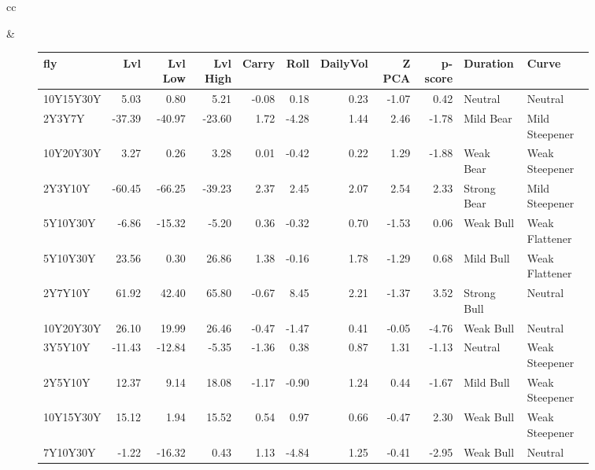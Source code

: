 \documentclass[a4paper,oneside]{report}
\begin{document}
\begin{figure}[htbp]
\begin{tabular}[c]{cc}
 
\begin{subfigure}[c]{0.5\textwidth}
 
 \end{subfigure}&
 
 \begin{subfigure}[c]{0.5\textwidth}
 \begin{adjustbox}{max width=\textwidth}
 \begin{tabular}{lrrrrrrrrll}
\hline
       fly &    Lvl &  Lvl Low &  Lvl High &  Carry &  Roll &  DailyVol &  Z PCA &  p-score &     Duration &           Curve \\
\hline
 10Y15Y30Y &   5.03 &     0.80 &      5.21 &  -0.08 &  0.18 &      0.23 &  -1.07 &     0.42 &      Neutral &         Neutral \\
    2Y3Y7Y & -37.39 &   -40.97 &    -23.60 &   1.72 & -4.28 &      1.44 &   2.46 &    -1.78 &    Mild Bear &  Mild Steepener \\
 10Y20Y30Y &   3.27 &     0.26 &      3.28 &   0.01 & -0.42 &      0.22 &   1.29 &    -1.88 &    Weak Bear &  Weak Steepener \\
   2Y3Y10Y & -60.45 &   -66.25 &    -39.23 &   2.37 &  2.45 &      2.07 &   2.54 &     2.33 &  Strong Bear &  Mild Steepener \\
  5Y10Y30Y &  -6.86 &   -15.32 &     -5.20 &   0.36 & -0.32 &      0.70 &  -1.53 &     0.06 &    Weak Bull &  Weak Flattener \\
  5Y10Y30Y &  23.56 &     0.30 &     26.86 &   1.38 & -0.16 &      1.78 &  -1.29 &     0.68 &    Mild Bull &  Weak Flattener \\
   2Y7Y10Y &  61.92 &    42.40 &     65.80 &  -0.67 &  8.45 &      2.21 &  -1.37 &     3.52 &  Strong Bull &         Neutral \\
 10Y20Y30Y &  26.10 &    19.99 &     26.46 &  -0.47 & -1.47 &      0.41 &  -0.05 &    -4.76 &    Weak Bull &         Neutral \\
   3Y5Y10Y & -11.43 &   -12.84 &     -5.35 &  -1.36 &  0.38 &      0.87 &   1.31 &    -1.13 &      Neutral &  Weak Steepener \\
   2Y5Y10Y &  12.37 &     9.14 &     18.08 &  -1.17 & -0.90 &      1.24 &   0.44 &    -1.67 &    Mild Bull &  Weak Steepener \\
 10Y15Y30Y &  15.12 &     1.94 &     15.52 &   0.54 &  0.97 &      0.66 &  -0.47 &     2.30 &    Weak Bull &  Weak Steepener \\
  7Y10Y30Y &  -1.22 &   -16.32 &      0.43 &   1.13 & -4.84 &      1.25 &  -0.41 &    -2.95 &    Weak Bull &         Neutral \\

\end{tabular}
\end{adjustbox}
\end{subfigure}
\end{tabular}
\end{figure}
\end{document}
